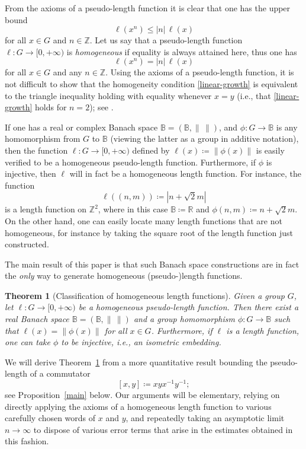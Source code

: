 \documentclass[11pt,a4paper,reqno]{amsart}
\numberwithin{equation}{section}
\theoremstyle{plain}
\newtheorem{theorem}[equation]{Theorem}
\theoremstyle{definition}
\newcommand\R{\mathbb{R}}
\newcommand\Z{\mathbb{Z}}
\newcommand\normsymb{\ell}  %
\newcommand\norm[1]{\ell({#1})}   %
\begin{document}
From the axioms of a pseudo-length function it is clear that one has the
upper bound
\[
\norm{x^n} \leq |n| \, \norm{x}
\]
for all $x \in G$ and $n \in \Z$.  Let us say that a pseudo-length
function $\normsymb: G\to [0,+\infty)$ is \emph{homogeneous} if equality
is always attained here, thus one has
\begin{equation}\label{linear-growth}
\norm{x^n} = |n| \, \norm{x}
\end{equation}
for all $x \in G$ and any $n \in \Z$.  Using the axioms of a
pseudo-length function, it is not difficult to show that the homogeneity
condition \eqref{linear-growth} is equivalent to the triangle inequality
holding with equality whenever $x=y$ (i.e., that \eqref{linear-growth}
holds for $n=2$); see \cite[Lemma 1]{GK}.

If one has a real or
complex Banach space $\mathbb{B} = (\mathbb{B},\| \, \|)$, and $\phi: G
\to \mathbb{B}$ is any homomorphism from $G$ to $\mathbb{B}$ (viewing the
latter as a group in additive notation), then the function $\normsymb: G
\to [0,+\infty)$ defined by $\norm{x} \coloneqq \| \phi(x) \|$ is easily
verified to be a homogeneous pseudo-length function.  Furthermore, if
$\phi$ is injective, then $\normsymb$ will in fact be a homogeneous
length function.  For instance, the function
\[
\norm{ (n, m) } \coloneqq |n + \sqrt{2} m|
\]
is a length function on $\Z^2$, where in this case $\mathbb{B} \coloneqq
\R$ and $\phi(n,m) \coloneqq n  + \sqrt{2} m$.  On the other hand, one
can easily locate many length functions that are not homogeneous, for
instance by taking the square root of the length function just
constructed.

The main result of this paper is that such Banach space constructions are
in fact the \emph{only} way to generate homogeneous (pseudo-)length
functions.

\begin{theorem}[Classification of homogeneous length functions]\label{class}
Given a group $G$, let $\normsymb: G \to [0,+\infty)$ be a homogeneous
pseudo-length function.  Then there exist a real Banach space $\mathbb{B}
= (\mathbb{B},\| \, \|)$ and a group homomorphism $\phi : G \to
\mathbb{B}$ such that $\norm{x} = \| \phi(x) \|$ for all $x \in G$.
Furthermore, if $\normsymb$ is a length function, one can take $\phi$ to
be injective, i.e., an isometric embedding.
\end{theorem}

We will derive Theorem~\ref{class} from a more quantitative result
bounding the pseudo-length of a commutator
\begin{equation}\label{comdef}
[x,y] \coloneqq xyx^{-1}y^{-1};
\end{equation}
see Proposition~\ref{main} below.  Our arguments will be elementary,
relying on directly applying the axioms of a homogeneous length function
to various carefully chosen words of $x$ and $y$, and repeatedly taking
an asymptotic limit $n \to \infty$ to dispose of various error terms that
arise in the estimates obtained in this fashion.
\end{document}
